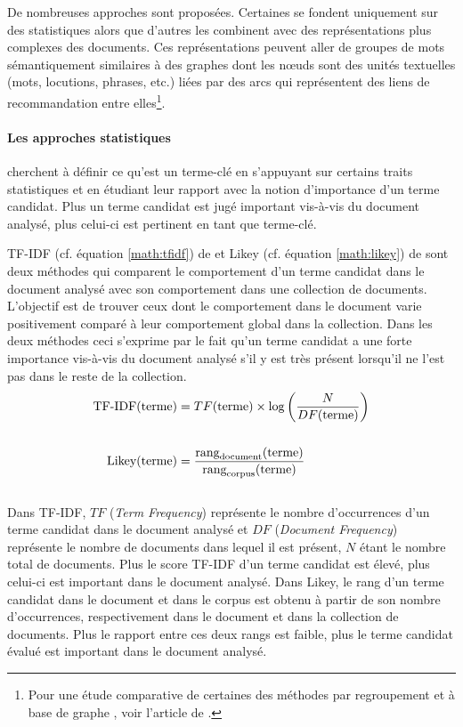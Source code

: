       De nombreuses approches sont proposées. Certaines se fondent uniquement sur
      des statistiques alors que d'autres les combinent avec des représentations
      plus complexes des documents. Ces représentations peuvent aller de groupes
      de mots sémantiquement similaires à des graphes dont les n\oe{}uds sont des
      unités textuelles (mots, locutions, phrases, etc.) liées par des arcs qui
      représentent des liens de recommandation entre elles\footnote{Pour une étude
      comparative de certaines des méthodes par regroupement
      \citep{liu2009keycluster} et à base de graphe \citep{mihalcea2004textrank,
      wan2008expandrank}, voir l'article de \citet{hassan2010conundrums}.}.

      \paragraph{Les approches statistiques}
        cherchent à définir ce qu'est un terme-clé en s'appuyant sur certains
        traits statistiques et en étudiant leur rapport avec la notion
        d'importance d'un terme candidat. Plus un terme candidat est jugé
        important vis-à-vis du document analysé, plus celui-ci est pertinent en
        tant que terme-clé.

        TF-IDF (cf. équation \ref{math:tfidf}) de \citet{jones1972tfidf} et Likey
        (cf. équation \ref{math:likey}) de \citet{paukkeri2010likey} sont deux
        méthodes qui comparent le comportement d'un terme candidat dans le
        document analysé avec son comportement dans une collection de documents.
        L'objectif est de trouver ceux dont le comportement dans
        le document varie positivement comparé à leur comportement global dans la
        collection. Dans les deux méthodes ceci s'exprime par le fait qu'un terme
        candidat a une forte importance vis-à-vis du document analysé s'il y est
        très présent lorsqu'il ne l'est pas dans le reste de la collection.
        \begin{align}
          \text{TF-IDF}(\text{terme}) &= TF(\text{terme}) \times \log\left(\frac{N}{DF(\text{terme})}\right) \label{math:tfidf}\\
          \notag\\
          \text{Likey}(\text{terme}) &= \frac{\text{rang}_{\text{document}}(\text{terme})}{\text{rang}_{\text{corpus}}(\text{terme})} \label{math:likey}
        \end{align}\\
        Dans TF-IDF, $TF$ (\textit{Term Frequency}) représente le nombre
        d'occurrences d'un terme candidat dans le document analysé et $DF$
        (\textit{Document Frequency}) représente le nombre de documents dans
        lequel il est présent, $N$ étant le nombre total de documents. Plus le
        score TF-IDF d'un terme candidat est élevé, plus celui-ci est important
        dans le document analysé. Dans Likey, le rang d'un terme candidat dans le
        document et dans le corpus est obtenu à partir de son nombre
        d'occurrences, respectivement dans le document et dans la collection de
        documents. Plus le rapport entre ces deux rangs est faible, plus le terme
        candidat évalué est important dans le document analysé.

